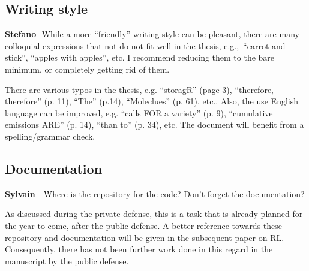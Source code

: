 \documentclass[12pt,a4paper]{article}
\def\eg{e.g.,\ }
\begin{document}
\subsection{Writing style}
\label{writing_style}

\begin{mdframed}[style=comment] %
{\color{orange} \textbf{Stefano}} -While a more ``friendly'' writing style can be pleasant, there are many colloquial expressions that not do not fit well in the thesis, \eg ``carrot and stick'', ``apples with apples'', etc. I recommend reducing them to the bare minimum, or completely getting rid of them. 
\end{mdframed}

\noindent

\begin{mdframed}[style=manuscript] %

\end{mdframed}

\begin{mdframed}[style=comment] %
There are various typos in the thesis, e.g. ``storagR'' (page 3), ``therefore, therefore'' (p. 11), ``The'' (p.14), ``Moleclues'' (p. 61), etc.. Also, the use English language can be improved, e.g. ``calls FOR a variety'' (p. 9), ``cumulative emissions ARE'' (p. 14), ``than to'' (p. 34), etc. The document will benefit from a spelling/grammar check.
\end{mdframed}

\noindent

\begin{mdframed}[style=manuscript] %

\end{mdframed}

\subsection{Documentation}
\label{documentation}

\begin{mdframed}[style=comment] %
{\color{purple} \textbf{Sylvain}} - Where is the repository for the code? Don't forget the documentation?
\end{mdframed}

\noindent As discussed during the private defense, this is a task that is already planned for the year to come, after the public defense. A better reference towards these repository and documentation will be given in the subsequent paper on RL. Consequently, there has not been further work done in this regard in the manuscript by the public defense.
\end{document}
